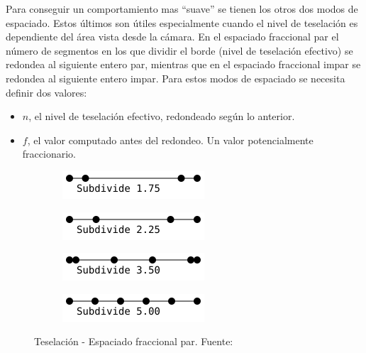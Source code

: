 Para conseguir un comportamiento mas ``suave'' se tienen los otros dos modos de
espaciado. Estos últimos son útiles especialmente cuando el nivel de teselación
es dependiente del área vista desde la cámara. En el espaciado fraccional par el
número de segmentos en los que dividir el borde (nivel de teselación efectivo)
se redondea al siguiente entero par, mientras que en el espaciado fraccional
impar se redondea al siguiente entero impar. Para estos modos de espaciado se
necesita definir dos valores:

\begin{itemize}
		\item $n$, el nivel de teselación efectivo, redondeado según lo
				anterior.
		\item $f$, el valor computado antes del redondeo. Un valor
				potencialmente fraccionario.
\end{itemize}

\begin{figure}
	\centering
	\begin{subfigure}{.45\textwidth}
			\includegraphics[width=\textwidth]{figures/even1.png}	
	\end{subfigure}
	\hfill
	\begin{subfigure}{.45\textwidth}
			\includegraphics[width=\textwidth]{figures/even2.png}	
	\end{subfigure}
	\newline
	\begin{subfigure}{.45\textwidth}
			\includegraphics[width=\textwidth]{figures/even3.png}	
	\end{subfigure}
	\hfill
	\begin{subfigure}{.45\textwidth}
			\includegraphics[width=\textwidth]{figures/even4.png}	
	\end{subfigure}
	\caption[Teselación - Espaciado fraccional par.]{Teselación - Espaciado
	fraccional par. Fuente:~\cite{TessellationImages}}
	\label{fig3.3}
\end{figure}


